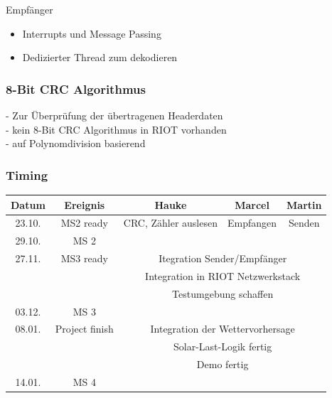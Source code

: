 \documentclass{beamer}
\begin{document}
	\begin{frame}{Empfänger}
		\begin{itemize}
			\item Interrupts und Message Passing
			\item Dedizierter Thread zum dekodieren
		\end{itemize}
	\end{frame}

	\begin{frame}
		\frametitle{8-Bit CRC Algorithmus} %
		- Zur Überprüfung der übertragenen Headerdaten\\
		- kein 8-Bit CRC Algorithmus in RIOT vorhanden\\
		- auf Polynomdivision basierend

	\end{frame}



	\begin{frame}
		\frametitle{ Timing }
		\small
		\begin{tabular}{|c|c|c|c|c|}
			\hline
			Datum  & Ereignis & Hauke & Marcel & Martin \\
			\hline
			23.10. & MS2 ready & CRC\checked, Zähler auslesen & Empfangen\checked & Senden\checked \\
			\hline
			29.10. & MS 2 & & &\\
			\hline
			27.11. & MS3 ready & \multicolumn{3}{|c|}{ Itegration Sender/Empfänger \checked} \\
			&  & \multicolumn{3}{|c|}{ Integration in RIOT Netzwerkstack }\\
			&  & \multicolumn{3}{|c|}{ Testumgebung schaffen \checked}\\
			\hline
			03.12. & MS 3 & & & \\
			\hline
			08.01. & Project finish & \multicolumn{3}{|c|}{ Integration der Wettervorhersage } \\
			&  & \multicolumn{3}{|c|}{ Solar-Last-Logik fertig }\\
			&  & \multicolumn{3}{|c|}{ Demo fertig }\\
			\hline
			14.01. & MS 4 & & & \\
			\hline
		\end{tabular}
	\end{frame}
\end{document}

